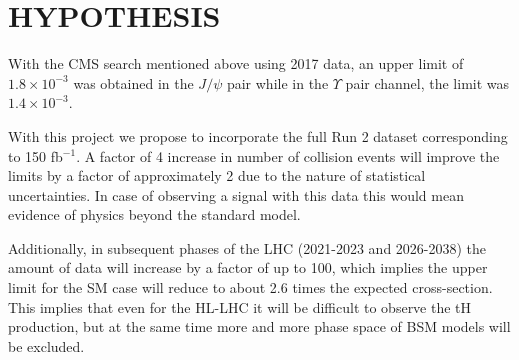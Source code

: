 \documentclass[final,3p]{CSP}
\begin{document}

\section{HYPOTHESIS}


\onehalfspacing With the CMS search mentioned above using 2017 data, an upper limit of $1.8 \times 10^{-3}$ was obtained in the $J/\psi$ pair while in the $\Upsilon$ pair channel, the limit was $1.4 \times 10^{-3}$.

With this project we propose to incorporate the full Run 2 dataset corresponding to 150 fb$^{-1}$.
A factor of 4 increase in number of collision events will improve the limits by a factor of approximately 2 due to the nature of statistical uncertainties. In case of observing a signal with this data this would mean evidence of physics beyond the standard model.

\iffalse
Additionally, in subsequent phases of the LHC (2021-2023 and 2026-2038) the amount of data will increase by a factor of up to 100, which implies the upper limit for the SM case will reduce to about 2.6 times the expected cross-section. This implies that even for the HL-LHC it will be difficult to observe the tH production, but at the same time more and more phase space of BSM models will be excluded.  
\end{document}
